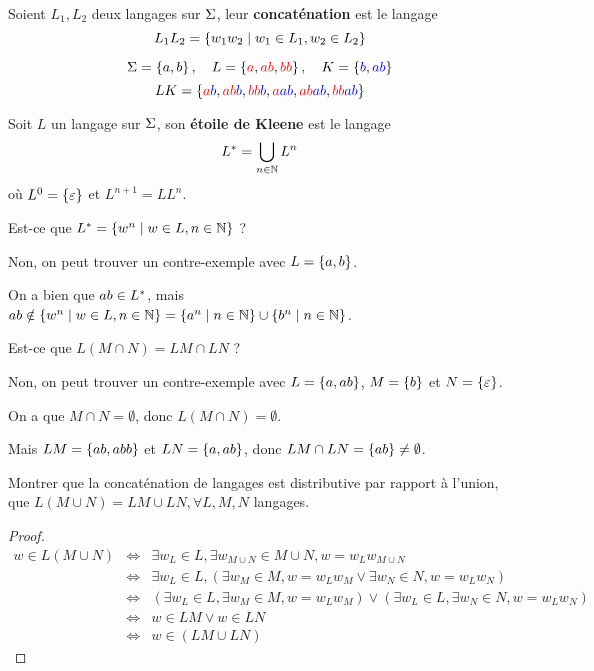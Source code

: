 \begin{definition}
	Soient $L_1, L_2$ deux langages sur $\Sigma$, leur \textbf{concaténation} est le langage
	$$
		L_1L_2 = \left\{w_1w_2 \mid w_1 \in L_1, w_2 \in L_2\right\}
	$$
\end{definition}

\begin{exemple}
	$$ \Sigma = \left\{a, b\right\}, \quad L = \left\{\textcolor{red}{a}, \textcolor{red}{ab}, \textcolor{red}{bb}\right\}, \quad K = \left\{\textcolor{blue}{b}, \textcolor{blue}{ab}\right\} $$
	$$ LK = \left\{\textcolor{red}{a} \textcolor{blue}{b}, \textcolor{red}{ab} \textcolor{blue}{b}, \textcolor{red}{bb} \textcolor{blue}{b}, \textcolor{red}{a} \textcolor{blue}{ab}, \textcolor{red}{ab} \textcolor{blue}{ab}, \textcolor{red}{bb} \textcolor{blue}{ab}\right\} $$
\end{exemple}


\begin{definition}
	Soit $L$ un langage sur $\Sigma$, son \textbf{étoile de Kleene} est le langage
	$$
		L^{*} = \bigcup_{n \in \mathbb{N}} L^n
	$$
	où $L^0 = \left\{\varepsilon\right\}$ et $L^{n+1} = LL^n$.
\end{definition}

\begin{remarque}
	Est-ce que $L^{*} = \left\{w^n \mid w \in L, n \in \mathbb{N}\right\}$ ?

	Non, on peut trouver un contre-exemple avec $L = \left\{a, b\right\}$.

	On a bien que $ab \in L^{*}$, mais $ab \notin \left\{w^n \mid w \in L, n \in \mathbb{N}\right\} = \left\{a^n \mid n \in \mathbb{N}\right\} \cup \left\{b^n \mid n \in \mathbb{N}\right\}$.
\end{remarque}

\begin{remarque}
	Est-ce que $L(M \cap N) = LM \cap LN$ ?

	Non, on peut trouver un contre-exemple avec $L = \left\{a, ab\right\}$, $M = \left\{b\right\}$ et $N = \left\{\varepsilon\right\}$.

	On a que $M \cap N = \emptyset$, donc $L(M \cap N) = \emptyset$.

	Mais $LM = \left\{ab, abb\right\}$ et $LN = \left\{a, ab\right\}$, donc $LM \cap LN = \left\{ab\right\} \neq \emptyset$.
\end{remarque}

\begin{exercice}
	Montrer que la concaténation de langages est distributive par rapport à l'union, \ie que $L(M \cup N) = LM \cup LN, \forall L, M, N$ langages.
\end{exercice}

\begin{proof}
	\begin{eqnarray*}
		w \in L(M \cup N) &\iff& \exists w_L \in L, \exists w_{M \cup N} \in M \cup N, w = w_Lw_{M \cup N} \\
		&\iff& \exists w_L \in L, (\exists w_M \in M, w = w_Lw_M \lor \exists w_N \in N, w = w_Lw_N) \\
		&\iff& (\exists w_L \in L, \exists w_M \in M, w = w_Lw_M) \lor (\exists w_L \in L,\exists w_N \in N, w = w_Lw_N) \\
		&\iff& w \in LM \lor w \in LN  \\
		&\iff& w \in (LM \cup LN)
	\end{eqnarray*}
\end{proof}


